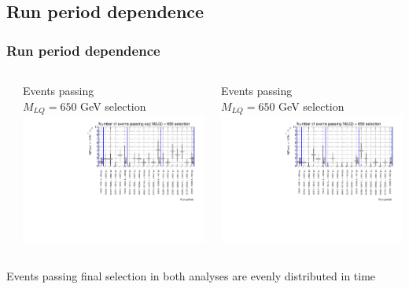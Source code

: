 \documentclass[bigger]{beamer}
\begin{document}
\subsection{Run period dependence}
\label{sec-1-5}
\begin{frame}
\frametitle{Run period dependence}
\label{sec-1-5-1}
\begin{columns} %
\label{sec-1-5-1-1}
\begin{column}{0.5\textwidth}
\label{sec-1-5-1-1-1}

\centering
Events passing \eejj \\
$M_{LQ} = 650$ GeV selection
\includegraphics[width=\textwidth]{fig/ee/run_dependence/nEventsPassing_eejj_LQM650.pdf}
\end{column}
\begin{column}{0.5\textwidth}
\label{sec-1-5-1-1-2}

\centering
Events passing \enujj \\
$M_{LQ} = 650$ GeV selection
\includegraphics[width=\textwidth]{fig/enu/run_dependence/nEventsPassing_enujj_LQM650.pdf}
\end{column}
\end{columns}
\label{sec-1-5-1-2}

\small
\centering
Events passing final selection in both analyses are evenly distributed in time
\normalsize
\end{frame}
\end{document}
